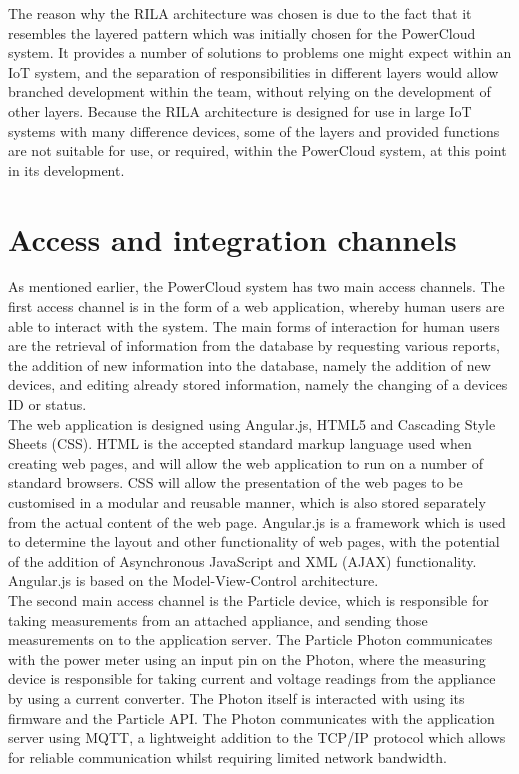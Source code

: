 \documentclass{article}
\begin{document}
	The reason why the RILA architecture was chosen is due to the fact 
	that it resembles the layered pattern which was initially chosen for 
	the PowerCloud system. It provides a number of solutions to problems 
	one might expect within an IoT system, and the separation of 
	responsibilities in different layers would allow branched development 
	within the team, without relying on the development of other layers. 
	Because the RILA architecture is designed for use in large IoT 
	systems with many difference devices, some of the layers and provided 
	functions are not suitable for use, or required, within the 
	PowerCloud system, at this point in its development.

\section{Access and integration channels}
	
	As mentioned earlier, the PowerCloud system has two main access 
	channels. The first access channel is in the form of a web 
	application, whereby human users are able to interact with the 
	system. The main forms of interaction for human users are the 
	retrieval of information from the database by requesting various 
	reports, the addition of new information into the database, namely 
	the addition of new devices, and editing already stored information, 
	namely the changing of a devices ID or status.\\
	
	The web application is designed using Angular.js, HTML5 and Cascading 
	Style Sheets (CSS). HTML is the accepted standard markup language 
	used when creating web pages, and will allow the web application to 
	run on a number of standard browsers. CSS will allow the presentation 
	of the web pages to be customised in a modular and reusable manner, 
	which is also stored separately from the actual content of the web 
	page. Angular.js is a framework which is used to determine the layout 
	and other functionality of web pages, with the potential of the 
	addition of Asynchronous JavaScript and XML (AJAX) functionality. 
	Angular.js is based on the Model-View-Control architecture.\\
	
	The second main access channel is the Particle device, which is 
	responsible for taking measurements from an attached appliance, and 
	sending those measurements on to the application server. The Particle 
	Photon communicates with the power meter using an input pin on the Photon, 
	where the measuring device is responsible for taking current and 
	voltage readings from the appliance by using a current converter. The 
	Photon itself is interacted with using its firmware and the Particle 
	API. The Photon communicates with the application server using MQTT, 
	a lightweight addition to the TCP/IP protocol which allows for 
	reliable communication whilst requiring limited network bandwidth.\\
	
\end{document}
